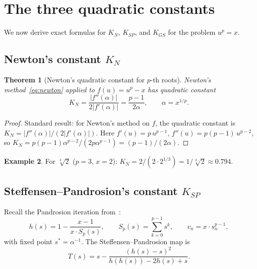 \documentclass[10pt,a4paper,oneside]{book}
\newtheorem{theorem}{Theorem}[chapter]
\theoremstyle{definition}
\newtheorem{example}[theorem]{Example}
\theoremstyle{remark}
\newcommand{\cbrt}[1]{\sqrt[3]{#1}}
\begin{document}
\section{The three quadratic constants}
\label{sec:constants}

We now derive exact formulas for $K_N$, $K_{SP}$, and $K_{GS}$ for the problem $u^p = x$.

\subsection{Newton's constant \texorpdfstring{$K_N$}{K\_N}}

\begin{theorem}[Newton's quadratic constant for $p$-th roots]
\label{thm:newton_constant}
Newton's method~\eqref{eq:newton} applied to $f(u) = u^p - x$ has quadratic constant
\begin{equation}
  \label{eq:KN}
  K_N = \frac{|f''(\alpha)|}{2|f'(\alpha)|} = \frac{p-1}{2\alpha},
  \qquad \alpha = x^{1/p}.
\end{equation}
\end{theorem}

\begin{proof}
Standard result: for Newton's method on $f$, the quadratic constant is $K_N = |f''(\alpha)|/(2|f'(\alpha)|)$.  Here $f'(u) = p\,u^{p-1}$, $f''(u) = p(p-1)\,u^{p-2}$, so $K_N = p(p-1)\alpha^{p-2}/(2p\alpha^{p-1}) = (p-1)/(2\alpha)$.
\end{proof}

\begin{example}
For $\cbrt{2}$ ($p=3$, $x=2$): $K_N = 2/(2 \cdot 2^{1/3}) = 1/\cbrt{2} \approx 0.794$.
\end{example}

\subsection{Steffensen--Pandrosion's constant \texorpdfstring{$K_{SP}$}{K\_SP}}

Recall the Pandrosion iteration from~\cite{besevic2026}:
\begin{equation}
  \label{eq:pandrosion}
  h(s) = 1 - \frac{x-1}{x \cdot S_p(s)},
  \qquad S_p(s) = \sum_{k=0}^{p-1} s^k,
  \qquad v_n = x \cdot s_n^{p-1},
\end{equation}
with fixed point $s^* = \alpha^{-1}$.  The Steffensen--Pandrosion map is
\[
  T(s) = s - \frac{(h(s) - s)^2}{h(h(s)) - 2h(s) + s}.
\]
\end{document}
